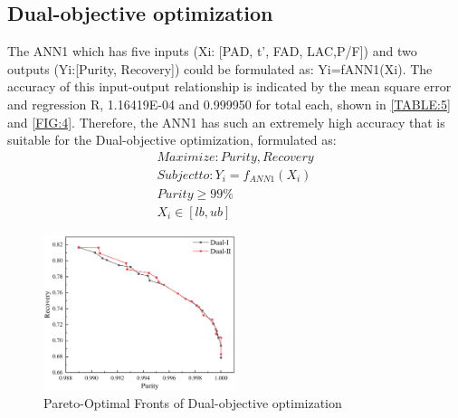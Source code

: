 \documentclass[preprint,12pt]{elsarticle}
\begin{document}
\subsection{Dual-objective optimization}
The ANN1 which has five inputs (Xi: [PAD, t’, FAD, LAC,P/F]) and two outputs (Yi:[Purity, Recovery]) could be formulated as: Yi=fANN1(Xi). The accuracy of this input-output relationship is indicated by the mean square error and regression R, 1.16419E-04 and 0.999950 for total each, shown in \cref{TABLE:5} and \cref{FIG:4}. Therefore, the ANN1 has such an extremely high accuracy that is suitable for the Dual-objective optimization, formulated as:
\begin{displaymath}
	\begin{array}{l}
		Maximize:     Purity, Recovery\\
		Subject to:      {Y_i} = {f_{ANN1}}({X_i})\\
		Purity \ge 99\% \\
		{X_i} \in [lb,ub] 
	\end{array}
\end{displaymath}
\begin{figure}
	\centering
	\includegraphics[width=0.5\textwidth]{figs/Fig9.pdf}
	\caption{Pareto-Optimal Fronts of Dual-objective optimization}
	\label{FIG:9}
\end{figure}
\end{document}
